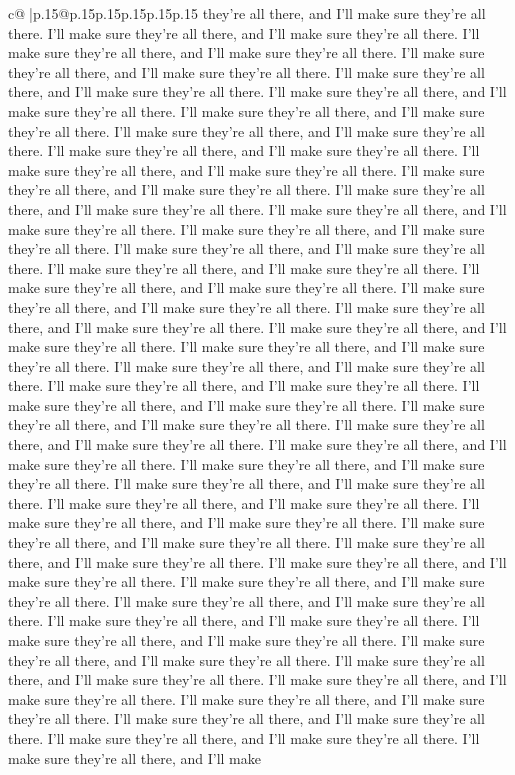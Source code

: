 \documentclass{article}
\begin{document}
{\begin{supertabular}{c@{$\;$}|p{.15\linewidth}@{}p{.15\linewidth}p{.15\linewidth}p{.15\linewidth}p{.15\linewidth}p{.15\linewidth}}
{{{they're all there, and I'll make sure they're all there. I'll make sure they're all there, and I'll make sure they're all there. I'll make sure they're all there, and I'll make sure they're all there. I'll make sure they're all there, and I'll make sure they're all there. I'll make sure they're all there, and I'll make sure they're all there. I'll make sure they're all there, and I'll make sure they're all there. I'll make sure they're all there, and I'll make sure they're all there. I'll make sure they're all there, and I'll make sure they're all there. I'll make sure they're all there, and I'll make sure they're all there. I'll make sure they're all there, and I'll make sure they're all there. I'll make sure they're all there, and I'll make sure they're all there. I'll make sure they're all there, and I'll make sure they're all there. I'll make sure they're all there, and I'll make sure they're all there. I'll make sure they're all there, and I'll make sure they're all there. I'll make sure they're all there, and I'll make sure they're all there. I'll make sure they're all there, and I'll make sure they're all there. I'll make sure they're all there, and I'll make sure they're all there. I'll make sure they're all there, and I'll make sure they're all there. I'll make sure they're all there, and I'll make sure they're all there. I'll make sure they're all there, and I'll make sure they're all there. I'll make sure they're all there, and I'll make sure they're all there. I'll make sure they're all there, and I'll make sure they're all there. I'll make sure they're all there, and I'll make sure they're all there. I'll make sure they're all there, and I'll make sure they're all there. I'll make sure they're all there, and I'll make sure they're all there. I'll make sure they're all there, and I'll make sure they're all there. I'll make sure they're all there, and I'll make sure they're all there. I'll make sure they're all there, and I'll make sure they're all there. I'll make sure they're all there, and I'll make sure they're all there. I'll make sure they're all there, and I'll make sure they're all there. I'll make sure they're all there, and I'll make sure they're all there. I'll make sure they're all there, and I'll make sure they're all there. I'll make sure they're all there, and I'll make sure they're all there. I'll make sure they're all there, and I'll make sure they're all there. I'll make sure they're all there, and I'll make sure they're all there. I'll make sure they're all there, and I'll make sure they're all there. I'll make sure they're all there, and I'll make sure they're all there. I'll make sure they're all there, and I'll make sure they're all there. I'll make sure they're all there, and I'll make sure they're all there. I'll make sure they're all there, and I'll make sure they're all there. I'll make sure they're all there, and I'll make sure they're all there. I'll make sure they're all there, and I'll make sure they're all there. I'll make sure they're all there, and I'll make sure they're all there. I'll make sure they're all there, and I'll make sure they're all there. I'll make sure they're all there, and I'll make }}}
\end{supertabular}}
\end{document}
